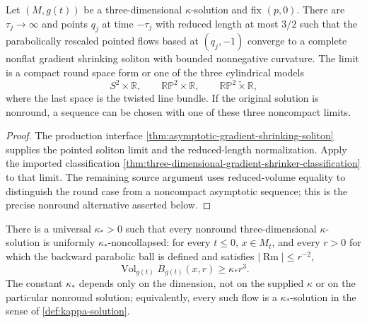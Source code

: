 \begin{theorem}
\label{thm:kappa-solution-asymptotic-models}
\notready
Let $(M,g(t))$ be a three-dimensional $\kappa$-solution and fix $(p,0)$.
There are $\tau_j\to\infty$ and points $q_j$ at time $-\tau_j$ with reduced
length at most $3/2$ such that the parabolically rescaled pointed flows based
at $(q_j,-1)$ converge to a complete nonflat gradient shrinking soliton with
bounded nonnegative curvature.  The limit is a compact round space form or
one of the three cylindrical models
\[
 S^2\times\mathbb R,\qquad
 \mathbb{RP}^2\times\mathbb R,\qquad
 \mathbb{RP}^2\widetilde\times\mathbb R,
\]
where the last space is the twisted line bundle.  If the original solution
is nonround, a sequence can be chosen with one of these three noncompact
limits.
\end{theorem}

\begin{proof}
The production interface \ref{thm:asymptotic-gradient-shrinking-soliton}
supplies the pointed soliton limit and the reduced-length normalization.
Apply the imported classification
\ref{thm:three-dimensional-gradient-shrinker-classification} to that limit.
The remaining source argument uses reduced-volume equality to distinguish the
round case from a noncompact asymptotic sequence; this is the precise
nonround alternative asserted below.
\end{proof}

\begin{proposition}
\label{prop:universal-nonround-kappa}
\notready
There is a universal $\kappa_*>0$ such that every nonround
three-dimensional $\kappa$-solution is uniformly $\kappa_*$-noncollapsed:
for every $t\le0$, $x\in M_t$, and every $r>0$ for which the backward
parabolic ball is defined and satisfies $|\operatorname{Rm}|\le r^{-2}$,
\[
 \operatorname{Vol}_{g(t)}B_{g(t)}(x,r)\ge\kappa_*r^3.
\]
The constant $\kappa_*$ depends only on the dimension, not on the supplied
$\kappa$ or on the particular nonround solution; equivalently, every such
flow is a $\kappa_*$-solution in the sense of \ref{def:kappa-solution}.
\end{proposition}

